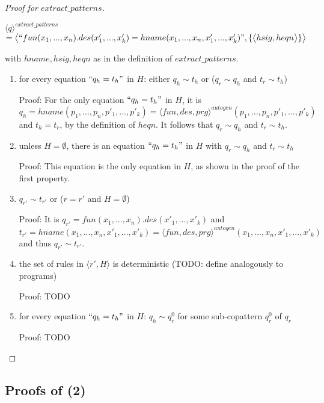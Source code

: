 \documentclass[11pt]{article} %
\begin{document}
\begin{proof}[Proof for $extract\_patterns$]
\begin{itemize}
$\langle q \rangle^{extract\_patterns}$\\
$= \big\langle `` fun(x_1, ..., x_n).des(x'_1, ..., x'_k) = hname(x_1, ..., x_n, x'_1, ..., x'_k) ", \{ \big\langle hsig, heqn \big\rangle \} \big\rangle $

with $hname, hsig, heqn$ as in the definition of $extract\_patterns$.

\begin{enumerate}
\item for every equation $`` q_h = t_h "$ in $H$: either $q_h \sim t_h$ or ($q_r \sim q_h$ and $t_r \sim t_h$)

Proof: For the only equation $`` q_h = t_h "$ in $H$, it is $q_h = hname(p_1, ..., p_n, p'_1, ..., p'_k) = \langle fun, des, prg \rangle^{autogen}(p_1, ..., p_n, p'_1, ..., p'_k)$ and $t_h = t_r$, by the definition of $heqn$. It follows that $q_r \sim q_h$ and $t_r \sim t_h$.

\item unless $H = \emptyset$, there is an equation $`` q_h = t_h "$ in $H$ with $q_r \sim q_h$ and $t_r \sim t_h$

Proof: This equation is the only equation in $H$, as shown in the proof of the first property.

\item $q_{r'} \sim t_{r'}$ or ($r = r'$ and $H = \emptyset$)

Proof: It is $q_{r'} = fun(x_1, ..., x_n).des(x'_1, ..., x'_k)$ and $t_{r'} = hname(x_1, ..., x_n, x'_1, ..., x'_k) = \langle fun, des, prg \rangle^{autogen}(x_1, ..., x_n, x'_1, ..., x'_k)$ and thus $q_{r'} \sim t_{r'}$.

\item the set of rules in $\big\langle r', H \big\rangle$ is deterministic (TODO: define analogously to programs)

Proof: TODO

\item for every equation $`` q_h = t_h "$ in $H$: $q_h \sim q^0_r$ for some sub-copattern $q^0_r$ of $q_r$

Proof: TODO

\end{enumerate}

\end{itemize}

\end{proof}

\subsection{Proofs of (2)}
\end{document}
